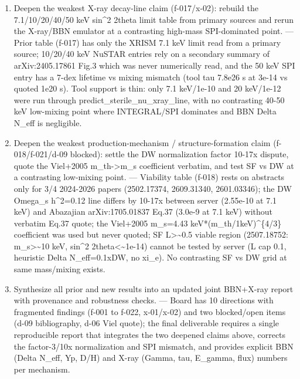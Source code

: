 \documentclass[11pt,a4paper]{article}
\begin{document}
\begin{enumerate}
  \item Deepen the weakest X-ray decay-line claim (f-017/x-02): rebuild the 7.1/10/20/40/50 keV sin\textasciicircum{}2 2theta limit table from primary sources and rerun the X-ray/BBN emulator at a contrasting high-mass SPI-dominated point. --- Prior table (f-017) has only the XRISM 7.1 keV limit read from a primary source; 10/20/40 keV NuSTAR entries rely on a secondary summary of arXiv:2405.17861 Fig.3 which was never numerically read, and the 50 keV SPI entry has a 7-dex lifetime vs mixing mismatch (tool tau 7.8e26 s at 3e-14 vs quoted 1e20 s). Tool support is thin: only 7.1 keV/1e-10 and 20 keV/1e-12 were run through predict\_sterile\_nu\_xray\_line, with no contrasting 40-50 keV low-mixing point where INTEGRAL/SPI dominates and BBN Delta N\_eff is negligible.
  \item Deepen the weakest production-mechanism / structure-formation claim (f-018/f-021/d-09 blocked): settle the DW normalization factor 10-17x dispute, quote the Viel+2005 m\_th-\textgreater{}m\_s coefficient verbatim, and test SF vs DW at a contrasting low-mixing point. --- Viability table (f-018) rests on abstracts only for 3/4 2024-2026 papers (2502.17374, 2609.31340, 2601.03346); the DW Omega\_s h\textasciicircum{}2=0.12 line differs by 10-17x between server (2.55e-10 at 7.1 keV) and Abazajian arXiv:1705.01837 Eq.37 (3.0e-9 at 7.1 keV) without verbatim Eq.37 quote; the Viel+2005 m\_s=4.43 keV*(m\_th/1keV)\textasciicircum{}\{4/3\} coefficient was used but never quoted; SF L\textgreater{}\textasciitilde{}0.5 viable region (2507.18752: m\_s\textgreater{}\textasciitilde{}10 keV, sin\textasciicircum{}2 2theta\textless{}\textasciitilde{}1e-14) cannot be tested by server (L cap 0.1, heuristic Delta N\_eff=0.1xDW, no xi\_e). No contrasting SF vs DW grid at same mass/mixing exists.
  \item Synthesize all prior and new results into an updated joint BBN+X-ray report with provenance and robustness checks. --- Board has 10 directions with fragmented findings (f-001 to f-022, x-01/x-02) and two blocked/open items (d-09 bibliography, d-06 Viel quote); the final deliverable requires a single reproducible report that integrates the two deepened claims above, corrects the factor-3/10x normalization and SPI mismatch, and provides explicit BBN (Delta N\_eff, Yp, D/H) and X-ray (Gamma, tau, E\_gamma, flux) numbers per mechanism.

\end{enumerate}
\end{document}
